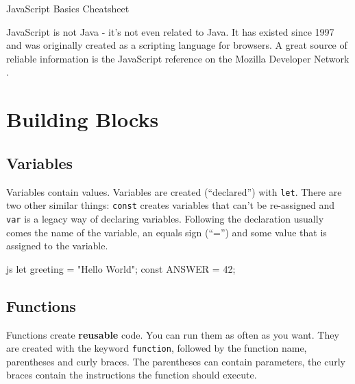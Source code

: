 \documentclass[10pt,a4paper]{article}
\begin{document}
{\color{accentcolor}JavaScript Basics Cheatsheet}

\begin{multicols}{3}

\scriptsize



JavaScript is not Java - it's not even related to Java. It has existed since 1997 and was originally created as a scripting language for browsers. A great source of reliable information is the JavaScript reference on the Mozilla Developer Network \cite{mdn-js}.

\section*{Building Blocks}

\subsection*{Variables}
Variables contain values. Variables are created (\enquote{declared}) with \texttt{let}. There are two other similar things: \texttt{const} creates variables that can't be re-assigned and \texttt{var} is a legacy way of declaring variables. Following the declaration usually comes the name of the variable, an equals sign (\enquote{=}) and some value that is assigned to the variable.

\begin{codebox}{js}{}
  let greeting = "Hello World";
  const ANSWER = 42;
\end{codebox}

\subsection*{Functions}
Functions create \textbf{reusable} code. You can run them as often as you want. They are created with the keyword \texttt{function}, followed by the function name, parentheses and curly braces. The parentheses can contain parameters, the curly braces contain the instructions the function should execute.


\end{multicols}
\end{document}
